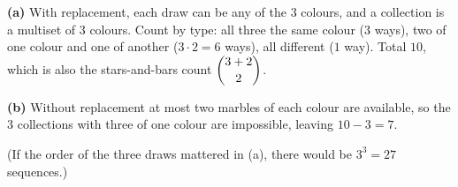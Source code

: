 \textbf{(a)} With replacement, each draw can be any of the $3$ colours, and a collection is a multiset of $3$ colours. Count by type: all three the same colour ($3$ ways), two of one colour and one of another ($3\cdot2=6$ ways), all different ($1$ way). Total $\boxed{10}$, which is also the stars-and-bars count $\dbinom{3+2}{2}$.

\textbf{(b)} Without replacement at most two marbles of each colour are available, so the $3$ collections with three of one colour are impossible, leaving $10-3=\boxed{7}$.

(If the order of the three draws mattered in (a), there would be $3^3=27$ sequences.)

